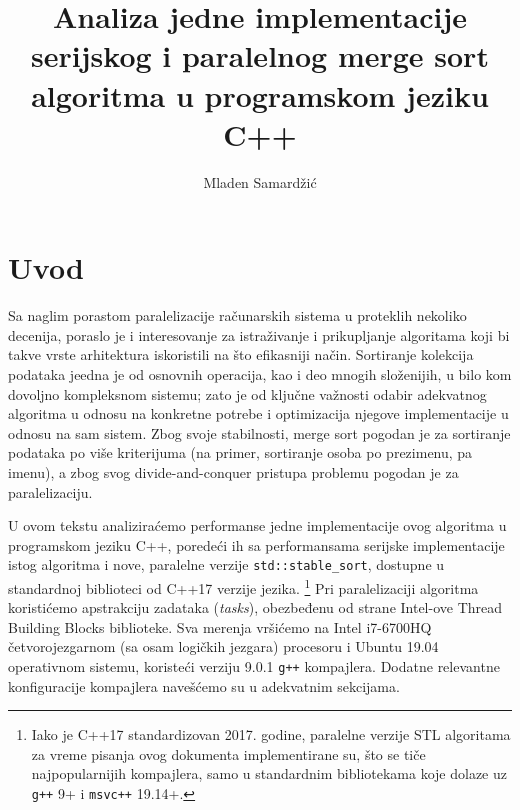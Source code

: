 \documentclass[a4paper,11pt]{article}
\author{Mladen Samardžić}
\title{Analiza jedne implementacije serijskog i paralelnog merge sort algoritma u programskom jeziku C++}
\date{}
\begin{document}
    \maketitle
    \thispagestyle{empty}
    \newpage

    \thispagestyle{empty}
    \mbox{}
    \newpage

    \tableofcontents
    \newpage

    \thispagestyle{empty}
    \mbox{}
    \newpage

    \section{Uvod}

    Sa naglim porastom paralelizacije računarskih sistema u proteklih nekoliko
    decenija, poraslo je i interesovanje za istraživanje i prikupljanje 
    algoritama koji bi takve vrste arhitektura iskoristili na što efikasniji
    način. Sortiranje kolekcija podataka jeedna je od osnovnih operacija, kao i
    deo mnogih složenijih, u bilo kom dovoljno kompleksnom sistemu; zato je od
    ključne važnosti odabir adekvatnog algoritma u odnosu na konkretne potrebe i optimizacija
    njegove implementacije u odnosu na sam sistem. Zbog svoje stabilnosti, merge
    sort pogodan je za sortiranje podataka po više kriterijuma (na primer, sortiranje
    osoba po prezimenu, pa imenu), a zbog svog divide-and-conquer pristupa problemu
    pogodan je za paralelizaciju. \par
    U ovom tekstu analiziraćemo performanse jedne implementacije ovog algoritma
    u programskom jeziku C++, poredeći ih sa performansama
    serijske implementacije istog algoritma i nove, paralelne verzije 
    \verb|std::stable_sort|, dostupne u standardnoj biblioteci od C++17 verzije jezika.
    \footnote{
        Iako je C++17 standardizovan 2017. godine, paralelne verzije STL algoritama
        za vreme pisanja ovog dokumenta implementirane su, što se tiče najpopularnijih kompajlera,
        samo u standardnim bibliotekama koje dolaze uz \verb|g++| 9+ i \verb|msvc++| 19.14+.
}
    Pri paralelizaciji algoritma koristićemo apstrakciju zadataka (\textit{tasks}), obezbeđenu od
    strane Intel-ove Thread Building Blocks biblioteke. Sva merenja vršićemo
    na Intel i7-6700HQ četvorojezgarnom (sa osam logičkih jezgara) procesoru i Ubuntu 19.04 operativnom
    sistemu, koristeći verziju 9.0.1 \verb|g++| kompajlera. Dodatne relevantne konfiguracije
    kompajlera navešćemo su u adekvatnim sekcijama.
\end{document}
